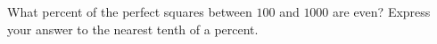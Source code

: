 What percent of the perfect squares between $100$ and $1000$ are even? Express your answer to the nearest tenth of a percent.
